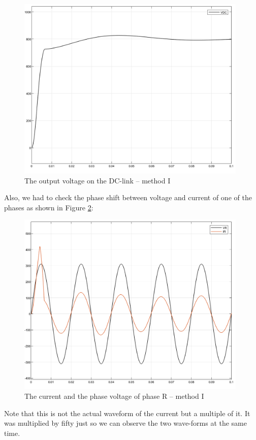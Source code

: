 \documentclass[12pt,a4paper]{book}
\begin{document}
\begin{figure}[h!]
  \centering
  \includegraphics[width=11cm]{image20.png}
  \caption{The output voltage on the DC-link -- method I}
  \label{fig:image20}
\end{figure}
Also, we had to check the phase shift between voltage and current of one of the phases as shown in Figure \ref{fig:image21}:

\begin{figure}[h!]
  \centering
  \includegraphics[width=11cm]{image21.png}
  \caption{The current and the phase voltage of phase R -- method I}
  \label{fig:image21}
\end{figure}
Note that this is not the actual waveform of the current but a multiple of it. It was multiplied by fifty just so we can observe the two wave-forms at the same time.
\end{document}
